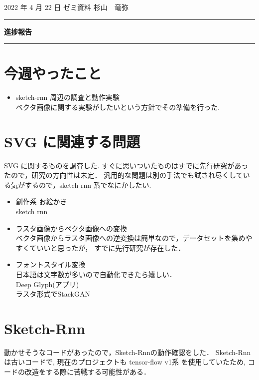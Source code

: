 \documentclass[onecolumn]{ujarticle}   %
\begin{document}

		\noindent
		\hspace{1em}
		2022 年 4 月 22 日
		ゼミ資料
		\hfill
		杉山　竜弥
		\vspace{2mm}

		\hrule
		\begin{center}
			{\Large \bf 進捗報告}
		\end{center}
		\hrule
		\vspace{9mm}


\section{今週やったこと}
\begin{itemize}
  \item sketch-rnn 周辺の調査と動作実験\\
  ベクタ画像に関する実験がしたいという方針でその準備を行った.
\end{itemize}

\section{SVG に関連する問題}
SVG に関するものを調査した. すぐに思いついたものはすでに先行研究があったので，研究の方向性は未定．
汎用的な問題は別の手法でも試され尽くしている気がするので，sketch rnn 系でなにかしたい.

\begin{itemize}
  \item 創作系  お絵かき\\
   sketch rnn\cite{ha2017neural}
  \item ラスタ画像からベクタ画像への変換\cite{liu2017raster}\\
      ベクタ画像からラスタ画像への逆変換は簡単なので，データセットを集めやすくていいと思ったが，
      すでに先行研究が存在した．
  \item フォントスタイル変換
  \\
  日本語は文字数が多いので自動化できたら嬉しい．\\
   Deep Glyph(アプリ)\\
   ラスタ形式でStackGAN
\end{itemize}

\section{Sketch-Rnn}
動かせそうなコードがあったので，Sketch-Rnnの動作確認をした．
Sketch-Rnn は古いコードで, 現在のプロジェクトも tensor-flow v1系 を使用していたため,
コードの改造をする際に苦戦する可能性がある．
\end{document}
